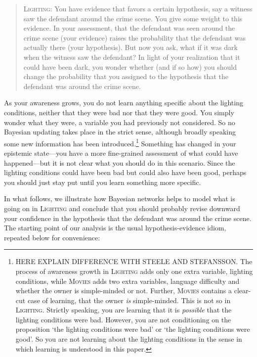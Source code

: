 \documentclass[
  11pt,
  dvipsnames,enabledeprecatedfontcommands]{scrartcl}
\begin{document}
\begin{quote}
\textsc{Lighting:} You have evidence that favors a certain hypothesis, say a witness 
saw the defendant around the crime scene. You give some weight to this evidence. 
In your assessment, that the defendant was seen around the crime scene (your evidence) raises the probability that the defendant was actually there (your hypothesis). But now you ask, what if it was dark when the witness saw the defendant? In light of your realization that it could have been dark, you wonder whether (and if so how) you should change the probability that you assigned to the hypothesis that the defendant was around the crime scene.
\end{quote}

As your awareness grows, you do not learn anything specific about the
lighting conditions, neither that they were bad nor that they were good.
You simply wonder what they were, a variable you had previously not
considered. So no Bayesian updating takes place in the strict sense,
although broadly speaking some new information has been
introduced.\footnote{HERE EXPLAIN DIFFERENCE WITH STEELE AND STEFANSSON.
  The process of awareness growth in \textsc{Lighting} adds only one
  extra variable, lighting conditions, while \textsc{Movies} adds two
  extra variables, language difficulty and whether the owner is
  simple-minded or not. Further, \textsc{Movies} contains a clear-cut
  case of learning, that the owner \emph{is} simple-minded. This is not
  so in \textsc{Lighting}. Strictly speaking, you are learning that it
  is \emph{possible} that the lighting conditions were bad. However, you
  are not conditioning on the proposition `the lighting conditions were
  bad' or `the lighting conditions were good'. So you are not learning
  about the lighting conditions in the sense in which learning is
  understood in this paper.} Something has changed in your epistemic
state---you have a more fine-grained assessment of what could have
happened---but it is not clear what you should do in this scenario.
Since the lighting conditions could have been bad but could also have
been good, perhaps you should just stay put until you learn something
more specific.

In what follows, we illustrate how Bayesian networks helps to model what
is going on in \textsc{Lighting} and conclude that you should probably
revise downward your confidence in the hypothesis that the defendant was
around the crime scene. The starting point of our analysis is the usual
hypothesis-evidence idiom, repeated below for convenience:
\end{document}
